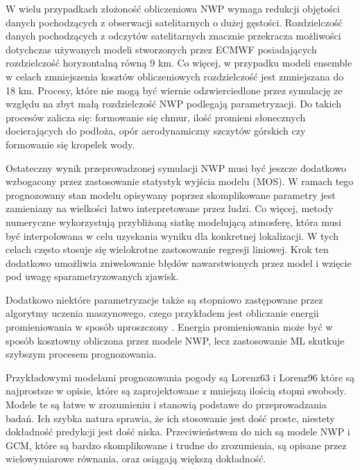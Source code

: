 W wielu przypadkach złożoność obliczeniowa NWP wymaga redukcji objętości danych pochodzących
z obserwacji satelitarnych o dużej gęstości. Rozdzielczość danych pochodzących z odczytów
satelitarnych znacznie przekracza możliwości dotychczas używanych modeli stworzonych przez
ECMWF posiadających rozdzielczość horyzontalną równą 9 km. Co więcej, w przypadku modeli
ensemble w celach zmniejszenia kosztów obliczeniowych rozdzielczość jest zmniejszana do 18 km.
Procesy, które nie mogą być wiernie odzwierciedlone przez symulację
ze względu na zbyt małą rozdzielczość NWP podlegają parametryzacji.
Do takich procesów zalicza się: formowanie się chmur, ilość promieni słonecznych docierających do 
podłoża, opór aerodynamiczny szczytów górskich czy formowanie się kropelek wody.

Ostateczny wynik przeprowadzonej symulacji NWP musi być jeszcze dodatkowo wzbogacony przez zastosowanie
statystyk wyjścia modelu (MOS). W ramach tego prognozowany stan modelu opisywany poprzez skomplikowane
parametry jest zamieniany na wielkości łatwo interpretowane przez ludzi. Co więcej, metody numeryczne
wykorzystują przybliżoną siatkę modelującą atmosferę, która musi być interpolowana w celu uzyskania
wyniku dla konkretnej lokalizacji. W tych celach często stosuje się wielokrotne zastosowanie 
regresji liniowej. Krok ten dodatkowo umożliwia zniwelowanie błędów nawarstwionych przez model i wzięcie
pod uwagę sparametryzowanych zjawisk.

Dodatkowo niektóre parametryzacje także są stopniowo zastępowane przez algorytmy uczenia maszynowego,
czego przykładem jest obliczanie energii promieniowania w sposób uproszczony
\cite{ai-in-weather-and-climate-prediction}. Energia promieniowania
może być w sposób kosztowny obliczona przez modele NWP, lecz zastosowanie ML skutkuje szybszym
procesem prognozowania.

Przykładowymi modelami prognozowania pogody są Lorenz63 i Lorenz96\cite{ai-in-weather-and-climate-prediction}
które są najprostsze w opisie,
które są zaprojektowane z mniejszą ilością stopni swobody. Modele te są łatwe w zrozumieniu i 
stanowią podstawe do przeprowadzania badań. Ich szybka natura sprawia, że ich stosowanie jest dość
proste, niestety dokładność predykcji jest dość niska. Przeciwieństwem do nich są modele NWP i GCM,
które są bardzo skomplikowane i trudne do zrozumienia, są opisane przez wielowymiarowe równania, oraz
osiągają większą dokładność.

